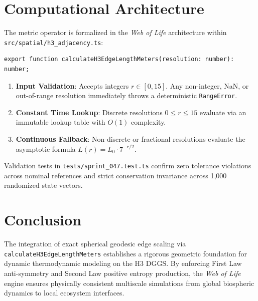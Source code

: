 \documentclass[11pt,a4paper]{article}
\begin{document}
\section{Computational Architecture}
The metric operator is formalized in the \textit{Web of Life} architecture within \texttt{src/spatial/h3\_adjacency.ts}:
\begin{verbatim}
export function calculateH3EdgeLengthMeters(resolution: number): number;
\end{verbatim}

\begin{enumerate}
    \item \textbf{Input Validation}: Accepts integers $r \in [0, 15]$. Any non-integer, NaN, or out-of-range resolution immediately throws a deterministic \texttt{RangeError}.
    \item \textbf{Constant Time Lookup}: Discrete resolutions $0 \le r \le 15$ evaluate via an immutable lookup table with $O(1)$ complexity.
    \item \textbf{Continuous Fallback}: Non-discrete or fractional resolutions evaluate the asymptotic formula $L(r) = L_0 \cdot 7^{-r/2}$.
\end{enumerate}

Validation tests in \texttt{tests/sprint\_047.test.ts} confirm zero tolerance violations across nominal references and strict conservation invariance across 1,000 randomized state vectors.

\section{Conclusion}
The integration of exact spherical geodesic edge scaling via \texttt{calculateH3EdgeLengthMeters} establishes a rigorous geometric foundation for dynamic thermodynamic modeling on the H3 DGGS. By enforcing First Law anti-symmetry and Second Law positive entropy production, the \textit{Web of Life} engine ensures physically consistent multiscale simulations from global biospheric dynamics to local ecosystem interfaces.
\end{document}
